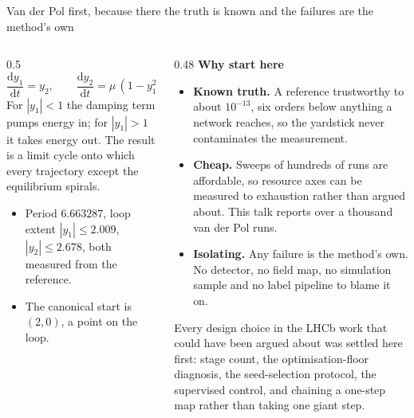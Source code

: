 \documentclass[aspectratio=169,10pt]{beamer}
\newcommand{\hl}[1]{{\color{accent}\textbf{#1}}}
\begin{document}

\begin{frame}[shrink=25]{Van der Pol first, because there the truth is known and the failures are the method's own}
  \vspace{1mm}
  \begin{columns}[T]
    \begin{column}{0.5\textwidth}
      \[ \frac{\mathrm{d}y_1}{\mathrm{d}t} = y_2, \qquad
         \frac{\mathrm{d}y_2}{\mathrm{d}t} = \mu\,(1 - y_1^2)\,y_2 - y_1,
         \qquad \mu = 1. \]
      For $|y_1| < 1$ the damping term pumps energy in; for $|y_1| > 1$ it takes
      energy out. The result is a limit cycle onto which every trajectory except
      the equilibrium spirals.
      \begin{itemize}\small
        \item Period \hl{$6.663287$}, loop extent $|y_1| \le 2.009$,
              $|y_2| \le 2.678$, both measured from the reference.
        \item The canonical start is $(2, 0)$, a point on the loop.
      \end{itemize}
    \end{column}
    \begin{column}{0.48\textwidth}
      \textbf{Why start here}
      \begin{itemize}
        \item \hl{Known truth.} A reference trustworthy to about $10^{-13}$, six
              orders below anything a network reaches, so the yardstick never
              contaminates the measurement.
        \item \hl{Cheap.} Sweeps of hundreds of runs are affordable, so resource
              axes can be measured to exhaustion rather than argued about. This
              talk reports over a thousand van der Pol runs.
        \item \hl{Isolating.} Any failure is the method's own. No detector, no
              field map, no simulation sample and no label pipeline to blame it
              on.
      \end{itemize}
      \smallskip
      {\small\color{black!60} Every design choice in the LHCb work that could
       have been argued about was settled here first: stage count, the
       optimisation-floor diagnosis, the seed-selection protocol, the supervised
       control, and chaining a one-step map rather than taking one giant step.}
    \end{column}
  \end{columns}
\end{frame}
\end{document}
